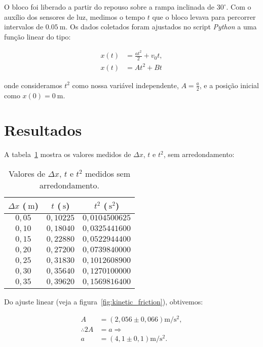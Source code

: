 \documentclass[10pt,oneside,twocolumn,a4paper]{article} %
\begin{document}
O bloco foi liberado a partir do repouso sobre a rampa inclinada de $30^\circ$.
Com o auxílio dos sensores de luz, medimos o tempo $t$ que o bloco levava para
percorrer intervalos de $\SI{0,05}{\metre}$. Os dados coletados foram ajustados
no script \textit{Python} a uma função linear do tipo:

\begin{align}
	x(t) &= \frac{at^2}{2} + v_0t, \nonumber \\
	x(t) &= At^2 + Bt
\end{align}

onde consideramos $t^2$ como nossa variável independente, $A = \frac{a}{2}$, e
a posição inicial como $x(0) = \SI{0}{\meter}$.

\section{Resultados}

A tabela~\ref{tbl:dados} mostra os valores medidos de $\Delta x$, $t$ e
$t^2$, sem arredondamento:

\begin{table}[ht!]
	\centering
		\begin{tabular}{|| c | c | c ||}
		\hline
		$\Delta x$ ($\SI{}{\metre}$) & $t$ ($\SI{}{\second}$) & $t^2$ ($\SI{}{\second^2}$) \\
		\hline\hline
		$0,05$ & $0,10225$ & $0,0104500625$ \\
		$0,10$ & $0,18040$ & $0,0325441600$ \\
		$0,15$ & $0,22880$ & $0,0522944400$ \\
		$0,20$ & $0,27200$ & $0,0739840000$ \\
		$0,25$ & $0,31830$ & $0,1012608900$ \\
		$0,30$ & $0,35640$ & $0,1270100000$ \\
		$0,35$ & $0,39620$ & $0,1569816400$ \\
		\hline
	\end{tabular}
	\caption{Valores de $\Delta x$, $t$ e $t^2$ medidos sem arredondamento.}
	\label{tbl:dados}
\end{table}

Do ajuste linear (veja a figura~\ref{fig:kinetic_friction}), obtivemos:

\begin{align}\label{eq:accel}
	A &= \left( 2,056 \pm 0,066 \right) \si{\metre\per\second\squared}, \nonumber \\
	\therefore 2A &= a \Rightarrow \nonumber \\
	a &= \left( 4,1 \pm 0,1 \right) \si{\metre\per\second\squared}.
\end{align}
\end{document}
